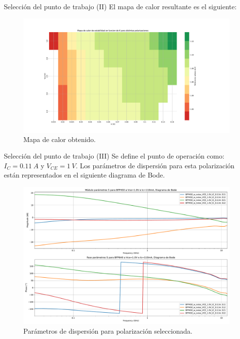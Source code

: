 \documentclass[9pt]{beamer}
\begin{document}
	\begin{frame}{Selección del punto de trabajo (II)}
		El mapa de calor resultante es el siguiente:
		\begin{figure}
			\centering
			\includegraphics[width=1\linewidth]{../heatmap}
			\caption{Mapa de calor obtenido.}
			\label{fig:heatmap}
		\end{figure}
		
	\end{frame}
	
	\begin{frame}{Selección del punto de trabajo (III)}
		Se define el punto de operación como: $I_C=0.11 \ A$ y $V_{CE}=1 \ V$. Los parámetros de dispersión para esta polarización están representados en el siguiente diagrama de Bode.
		\begin{figure}
			\centering
			\includegraphics[width=0.7\linewidth]{../bfp450_vce_1_ic_0.11}
			\caption{Parámetros de dispersión para polarización seleccionada.}
			\label{fig:bfp450vce1ic0}
		\end{figure}
	\end{frame}
	
\end{document}

